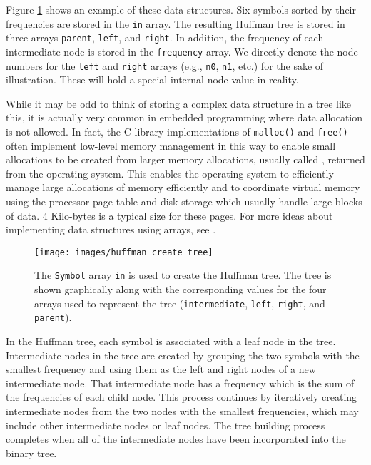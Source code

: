 Figure \ref{fig:huffman_create_tree} shows an example of these data structures. Six symbols sorted by their frequencies are stored in the \lstinline{in} array. The resulting Huffman tree is stored in three arrays \lstinline{parent}, \lstinline{left}, and \lstinline{right}.  In addition, the frequency of each intermediate node is stored in the \lstinline{frequency} array.  We directly denote the node numbers for the \lstinline{left} and \lstinline{right} arrays (e.g., \lstinline{n0}, \lstinline{n1}, etc.) for the sake of illustration. These will hold a special internal node value in reality. 

\begin{aside}
While it may be odd to think of storing a complex data structure in a tree like this, it is actually very common in embedded programming where data allocation is not allowed\cite{misra2012}.  In fact, the C library implementations of \lstinline{malloc()} and \lstinline{free()} often implement low-level memory management in this way to enable small allocations to be created from larger memory allocations, usually called , returned from the operating system.  This enables the operating system to efficiently manage large allocations of memory efficiently and to coordinate virtual memory using the processor page table and disk storage which usually handle large blocks of data.  4 Kilo-bytes is a typical size for these pages.  For more ideas about implementing data structures using arrays, see \cite{sedgewickalgorithmsinC}.
\end{aside}

\begin{figure}
\centering
\texttt{[image: images/huffman\_create\_tree]}
\caption{ The \lstinline{Symbol} array \lstinline{in} is used to create the Huffman tree. The tree is shown graphically along with the corresponding values for the four arrays used to represent the tree (\lstinline{intermediate}, \lstinline{left}, \lstinline{right}, and \lstinline{parent}).   }
\label{fig:huffman_create_tree}
\end{figure}

In the Huffman tree, each symbol is associated with a leaf node in the tree.  Intermediate nodes in the tree are created by grouping the two symbols with the smallest frequency and using them as the left and right nodes of a new intermediate node. That intermediate node has a frequency which is the sum of the frequencies of each child node. This process continues by iteratively creating intermediate nodes from the two nodes with the smallest frequencies, which may include other intermediate nodes or leaf nodes.  The tree building process completes when all of the intermediate nodes have been incorporated into the binary tree.

